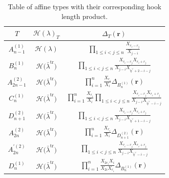 \documentclass[10pt,a4paper]{amsart}
\numberwithin{equation}{section}
\def\cch{\mathcal H}
\begin{document}
\begin{table}[th]\centering\renewcommand{\arraystretch}{1.55}
\caption{Table of affine types with their corresponding hook length product.}\label{tableau2}
	\begin{tabular}{|c|c|c|}
		\hline
		$T$ & $\cch(\lambda)_T$ & $\Delta_T(\mathbf{r})$ \\
		\hline
		\rule{0pt}{17pt} $A^{(1)}_{n-1}$ & $\cch(\lambda)$ &
		$\displaystyle\prod_{1\leq i<j\leq n} \frac{X_{r_i-r_j}}{X_{j-i}}$\\
		\hline
		\rule{0pt}{17pt} $B^{(1)}_{n}$& $\cch\bigl(\bar{\lambda}^{\mathrm{tr}}\bigr)$ &$\displaystyle\prod_{1\leq i<j\leq n} \frac{X_{r_i-r_j}X_{r_i+r_j}}{X_{j-i}X_{\tilde{\eta}^{\vee}+2-i-j}}$ \\
		\hline
		\rule{0pt}{17pt}$A^{(2)}_{2n-1}$ & $\cch\bigl(\bar{\lambda}^{\mathrm{tr}}\bigr)$ &$\displaystyle \prod_{i=1}^{n}\frac{X_{r_i}}{X_i}\Delta_{B_n^{(1)}}(\mathbf{r})$\\
		\hline
		\rule{0pt}{17pt}$C^{(1)}_{n}$& $\cch\bigl(\bar{\lambda}^{\mathrm{tr}}\bigr)$ &$\displaystyle \prod_{i=1}^{n}\frac{X_{r_i}}{X_i}\displaystyle\prod_{1\leq i<j\leq n} \frac{X_{r_i-r_j}X_{r_i+r_j}}{X_{j-i}X_{\tilde{\eta}^{\vee}-i-j}}$\\
		\hline
		\rule{0pt}{17pt}$D^{(2)}_{n+1}$& $\cch\bigl(\bar{\lambda}^{\mathrm{tr}}\bigr)$ &$\displaystyle\prod_{1\leq i<j\leq n} \frac{X_{r_i-r_j}X_{r_i+r_j}}{X_{j-i}X_{\tilde{\eta}^{\vee}+1-i-j}}$\\
		\hline
		\rule{0pt}{17pt}$A^{(2)}_{2n}$& $\cch\bigl(\bar{\lambda}^{\mathrm{tr}}\bigr)$ & $\displaystyle \prod_{i=1}^{n}\frac{X_{r_i}}{X_i}\Delta_{D_{n+1}^{(2)}}(\mathbf{r})$\\
		\hline
		\rule{0pt}{17pt}$A^{\prime (2)}_{2n}$& $\cch\bigl(\bar{\lambda}^{\mathrm{tr}}\bigr)$ &$\displaystyle\prod_{1\leq i<j\leq n} \frac{X_{r_i-r_j}X_{r_i+r_j}}{X_{j-i}X_{\tilde{\eta}^{\vee}-i-j}}$ \\
		\hline
		
		\rule{0pt}{15pt}$D^{(1)}_{n}$& $\displaystyle \cch\bigl(\bar{\lambda}^{\mathrm{tr}}\bigr)$ & $\displaystyle \prod_{i=1}^{n}\frac{X_{2r_i}X_i}{X_{2i}X_{r_i} }\Delta_{B_n^{(1)}}(\mathbf{r})$\\
		\hline
	\end{tabular}
\end{table}
\end{document}
